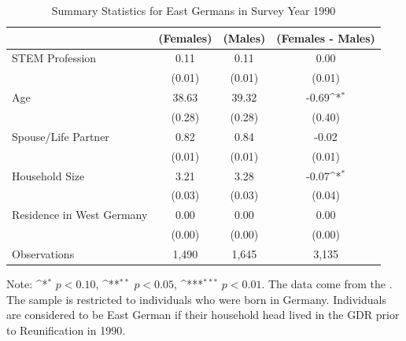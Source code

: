\documentclass[a4paper, oneside, hyperfootnotes = false]{article}
\def\sym#1{\ifmmode^{#1}\else\(^{#1}\)\fi}
\begin{document}
{\begin{table}[ht]
	\caption{Summary Statistics for East Germans in Survey Year 1990}
	\label{tab:descr_summary_east}
	\begin{center}
		\begin{tabular}{l*{3}{c}}
			\toprule
			& (Females) & (Males) & (Females - Males) \\
			\midrule
			STEM Profession & 0.11  & 0.11  &   0.00     \\
			&   (0.01)  & (0.01) & (0.01) \\
			\addlinespace
			Age         &   38.63   &  39.32  &  -0.69\sym{*}     \\
			&     (0.28) &        (0.28)         &      (0.40) \\
			\addlinespace
			Spouse/Life Partner &  0.82      &  0.84  &    -0.02    \\
			&      (0.01)&          (0.01)&         (0.01) \\
			\addlinespace
			Household Size      &  3.21   &  3.28   &   -0.07\sym{*}       \\
			&          (0.03)&       (0.03)        &      (0.04)\\
			\addlinespace
			Residence in West Germany&  0.00   &   0.00  &  0.00         \\
			&         (0.00) &       (0.00)&  (0.00)\\
			\midrule
			Observations        &  1,490    &    1,645     &      3,135             \\
			\bottomrule
		\end{tabular}
		
		\vspace{2mm}
		
		\parbox{10cm}{
			\linespread{1}\footnotesize Note: \sym{*} \(p<0.10\), \sym{**} \(p<0.05\), \sym{***} \(p<0.01\). The data come from the \cite{SOEP2023}. The sample is restricted to individuals who were born in Germany. Individuals are considered to be East German if their household head lived in the GDR prior to Reunification in 1990.}
		
	\end{center}
\end{table}

}
\end{document}
